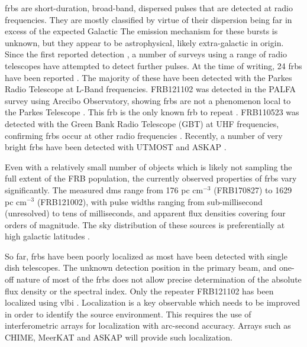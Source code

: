 \documentclass[a4paper,fleqn,usenatbib]{mnras}
\begin{document}
\glspl{frb} are short-duration, broad-band, dispersed pulses that are detected
at radio frequencies. They are mostly classified by virtue of their dispersion being far in excess of the expected Galactic
The emission mechanism for these bursts is unknown, but
they appear to be astrophysical, likely extra-galactic in origin. Since the
first reported detection \citep{2007Sci...318..777L}, a number of surveys using a
range of radio telescopes have attempted to detect further pulses. At the time
of writing, 24 \glspl{frb} have been reported \citep[for an up-to-date list,
see][]{2016PASA...33...45P}. The majority of these have been detected with the
Parkes Radio Telescope at L-Band frequencies. FRB121102 was detected in the
PALFA survey using Arecibo Observatory, showing \glspl{frb} are not a phenomenon
local to the Parkes Telescope \citep{2014ApJ...790..101S}. This \gls{frb} is the
only known \gls{frb} to repeat \citep{2016ApJ...833..177S}. FRB110523 was
detected with the Green Bank Radio Telescope (GBT) at UHF frequencies, confirming
\glspl{frb} occur at other radio frequencies \citep{2015Natur.528..523M}.
Recently, a number of very bright \glspl{frb} have been detected with UTMOST
\citep{2017MNRAS.468.3746C,atel10697} and ASKAP \citep{2017ApJ...841L..12B}.

Even with a relatively small number of objects which is likely not sampling the
full extent of the FRB population, the currently observed properties of
\glspl{frb} vary significantly. The measured \glspl{dm} range from 176
pc cm$^{-3}$ (FRB170827) to 1629 pc cm$^{-3}$ (FRB121002), with pulse widths ranging from
sub-millisecond (unresolved) to tens of milliseconds, and apparent flux densities
covering four orders of magnitude. The sky distribution of these sources is
preferentially at high galactic latitudes \citep{2015MNRAS.451.3278M}.

So far, \glspl{frb} have been poorly localized as most have been detected with
single dish telescopes. The unknown detection position in the primary beam, and one-off
nature of most of the \glspl{frb} does not allow precise determination of the absolute flux
density or the spectral index. Only the repeater FRB121102 has been localized using \gls{vlbi}
\citep{2017ApJ...834L...8M, 2017ApJ...834L...7T}. Localization is a key
observable which needs to be improved in order to identify the source
environment. This requires the use of interferometric arrays for localization with 
arc-second accuracy. Arrays such as CHIME, MeerKAT and ASKAP will provide such
localization.
\end{document}
